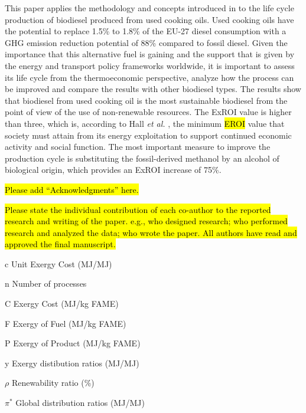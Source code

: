 \documentclass[sustainability,article,accept,moreauthors,pdftex,12pt,a4paper]{mdpi}
\begin{document}
This paper applies the methodology and concepts introduced in \cite{FontdeMora2012,FontdeMora2013,Torres2012b} to the life cycle production of biodiesel produced from used cooking oils. Used cooking oils have the potential to replace 1.5\% to 1.8\% of the EU-27 diesel consumption with a GHG emission reduction potential of 88\% compared to fossil diesel. Given the importance that this alternative fuel is gaining and the support that is given by the energy and transport policy frameworks worldwide, it is important to assess its life cycle from the thermoeconomic perspective, analyze how the process can be improved and compare the results with other biodiesel types. The results show that biodiesel from used cooking oil is the most sustainable biodiesel from the point of view of the use of non-renewable resources. The ExROI value is higher than three, which is, according to Hall \textit{et al.} \cite{Hall2009}, the minimum \hl{EROI} %
 value that society must attain from its energy exploitation to support continued economic activity and social function. The most important measure to improve the production cycle is substituting the fossil-derived methanol by an alcohol of biological origin, which provides an ExROI increase of 75\%.


\hl{Please add ``Acknowledgments'' here.} 

\hl{
Please state the individual contribution of each co-author to the reported research and writing of the paper. e.g., who designed research; who performed research and analyzed the data; who wrote the paper. All authors have read and approved the final manuscript.}



\vspace{-6pt}
\begin{list}{}{
 \renewcommand*{\makelabel}[1]{\hspace{\labelsep}\raggedleft #1} 
 \setlength{\labelwidth}{3em}
 \setlength{\leftmargin}{\labelwidth}
 \setlength{\parsep}{0pt}
 \setlength{\itemsep}{0pt}
 \sloppy}
 \item[c] Unit Exergy Cost (MJ/MJ)
 \item[n] Number of processes
 \item[C] Exergy Cost (MJ/kg FAME) 
 \item[F] Exergy of Fuel (MJ/kg FAME)
 \item[P] Exergy of Product (MJ/kg FAME)
 \item[y] Exergy distibution ratios (MJ/MJ)
 \item[$\rho$] Renewability ratio (\%)
 \item[$\pi^*$] Global distribution ratios (MJ/MJ)
\end{list}
\end{document}
